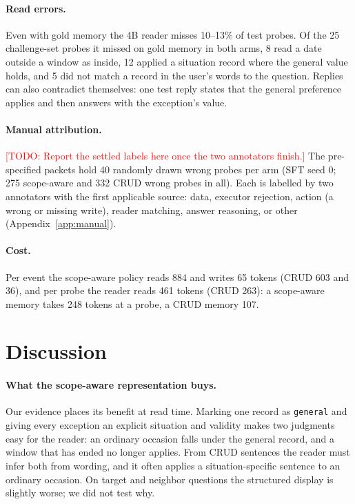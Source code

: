 \documentclass[11pt]{article}
\newcommand{\todo}[1]{\textcolor{red}{[TODO: #1]}}
\begin{document}
\paragraph{Read errors.} Even with gold memory the 4B reader misses 10--13\% of test probes. Of the 25 challenge-set probes it missed on gold memory in both arms, 8 read a date outside a window as inside, 12 applied a situation record where the general value holds, and 5 did not match a record in the user's words to the question. Replies can also contradict themselves: one test reply states that the general preference applies and then answers with the exception's value.

\paragraph{Manual attribution.} \todo{Report the settled labels here once the two annotators finish.} The pre-specified packets hold 40 randomly drawn wrong probes per arm (SFT seed 0; 275 scope-aware and 332 CRUD wrong probes in all). Each is labelled by two annotators with the first applicable source: data, executor rejection, action (a wrong or missing write), reader matching, answer reasoning, or other (Appendix~\ref{app:manual}).

\paragraph{Cost.} Per event the scope-aware policy reads 884 and writes 65 tokens (CRUD 603 and 36), and per probe the reader reads 461 tokens (CRUD 263): a scope-aware memory takes 248 tokens at a probe, a CRUD memory 107.

\section{Discussion}

\paragraph{What the scope-aware representation buys.} Our evidence places its benefit at read time. Marking one record as \texttt{general} and giving every exception an explicit situation and validity makes two judgments easy for the reader: an ordinary occasion falls under the general record, and a window that has ended no longer applies. From CRUD sentences the reader must infer both from wording, and it often applies a situation-specific sentence to an ordinary occasion. On target and neighbor questions the structured display is slightly worse; we did not test why.
\end{document}
